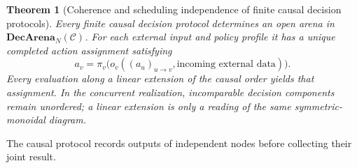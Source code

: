 \documentclass[11pt,a4paper]{article}
\numberwithin{equation}{section}
\newtheorem{theorem}{Theorem}[section]
\theoremstyle{definition}
\theoremstyle{remark}
\theoremstyle{plain}
\begin{document}
\begin{theorem}[Coherence and scheduling independence of finite causal decision protocols]
\label{thm:egt-causal-protocol}
Every finite causal decision protocol determines an open arena in
$\mathbf{DecArena}_N(\mathcal C)$. For each external input and policy profile it
has a unique completed action assignment satisfying
\[
 a_v=\pi_v\bigl(o_v((a_u)_{u\to v},\text{incoming external data})\bigr).
\]
Every evaluation along a linear extension of the causal order yields that
assignment. In the concurrent realization, incomparable decision components
remain unordered; a linear extension is only a reading of the same
symmetric-monoidal diagram.
\end{theorem}

\noindent The causal protocol records outputs of independent nodes before collecting their joint result.
\begin{center}
\end{center}
\end{document}
